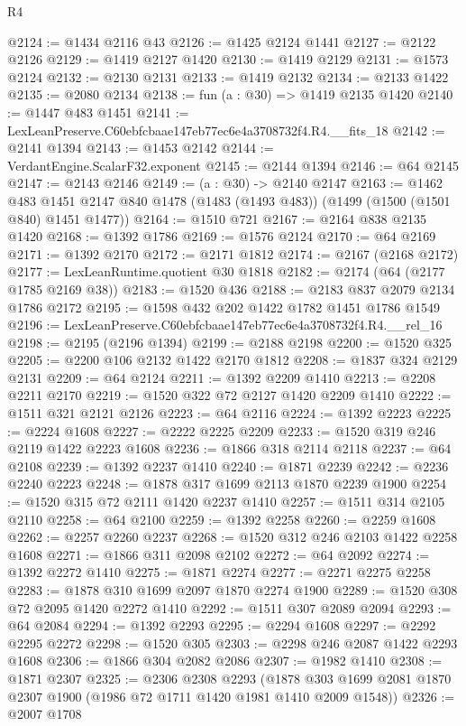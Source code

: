 \begin{lexlean}{R4}
\begin{coremodule}
@2124 := @1434 @2116 @43
@2126 := @1425 @2124 @1441
@2127 := @2122 @2126
@2129 := @1419 @2127 @1420
@2130 := @1419 @2129
@2131 := @1573 @2124
@2132 := @2130 @2131
@2133 := @1419 @2132
@2134 := @2133 @1422
@2135 := @2080 @2134
@2138 := fun (a : @30) => @1419 @2135 @1420
@2140 := @1447 @483 @1451
@2141 := LexLeanPreserve.C60ebfcbaae147eb77ec6e4a3708732f4.R4.__fits_18
@2142 := @2141 @1394
@2143 := @1453 @2142
@2144 := VerdantEngine.ScalarF32.exponent
@2145 := @2144 @1394
@2146 := @64 @2145
@2147 := @2143 @2146
@2149 := (a : @30) -> @2140 @2147
@2163 := @1462
    @483
    @1451
    @2147
    @840
    @1478
    (@1483 (@1493 @483))
    (@1499 (@1500 (@1501 @840) @1451 @1477))
@2164 := @1510 @721
@2167 := @2164 @838 @2135 @1420
@2168 := @1392 @1786
@2169 := @1576 @2124
@2170 := @64 @2169
@2171 := @1392 @2170
@2172 := @2171 @1812
@2174 := @2167 (@2168 @2172)
@2177 := LexLeanRuntime.quotient @30 @1818
@2182 := @2174 (@64 (@2177 @1785 @2169 @38))
@2183 := @1520 @436
@2188 := @2183 @837 @2079 @2134 @1786 @2172
@2195 := @1598 @432 @202 @1422 @1782 @1451 @1786 @1549
@2196 := LexLeanPreserve.C60ebfcbaae147eb77ec6e4a3708732f4.R4.__rel_16
@2198 := @2195 (@2196 @1394)
@2199 := @2188 @2198
@2200 := @1520 @325
@2205 := @2200 @106 @2132 @1422 @2170 @1812
@2208 := @1837 @324 @2129 @2131
@2209 := @64 @2124
@2211 := @1392 @2209 @1410
@2213 := @2208 @2211 @2170
@2219 := @1520 @322 @72 @2127 @1420 @2209 @1410
@2222 := @1511 @321 @2121 @2126
@2223 := @64 @2116
@2224 := @1392 @2223
@2225 := @2224 @1608
@2227 := @2222 @2225 @2209
@2233 := @1520 @319 @246 @2119 @1422 @2223 @1608
@2236 := @1866 @318 @2114 @2118
@2237 := @64 @2108
@2239 := @1392 @2237 @1410
@2240 := @1871 @2239
@2242 := @2236 @2240 @2223
@2248 := @1878 @317 @1699 @2113 @1870 @2239 @1900
@2254 := @1520 @315 @72 @2111 @1420 @2237 @1410
@2257 := @1511 @314 @2105 @2110
@2258 := @64 @2100
@2259 := @1392 @2258
@2260 := @2259 @1608
@2262 := @2257 @2260 @2237
@2268 := @1520 @312 @246 @2103 @1422 @2258 @1608
@2271 := @1866 @311 @2098 @2102
@2272 := @64 @2092
@2274 := @1392 @2272 @1410
@2275 := @1871 @2274
@2277 := @2271 @2275 @2258
@2283 := @1878 @310 @1699 @2097 @1870 @2274 @1900
@2289 := @1520 @308 @72 @2095 @1420 @2272 @1410
@2292 := @1511 @307 @2089 @2094
@2293 := @64 @2084
@2294 := @1392 @2293
@2295 := @2294 @1608
@2297 := @2292 @2295 @2272
@2298 := @1520 @305
@2303 := @2298 @246 @2087 @1422 @2293 @1608
@2306 := @1866 @304 @2082 @2086
@2307 := @1982 @1410
@2308 := @1871 @2307
@2325 := @2306
    @2308
    @2293
    (@1878 @303 @1699 @2081 @1870 @2307 @1900 (@1986 @72 @1711 @1420 @1981 @1410 @2009 @1548))
@2326 := @2007 @1708

\end{coremodule}
\end{lexlean}
